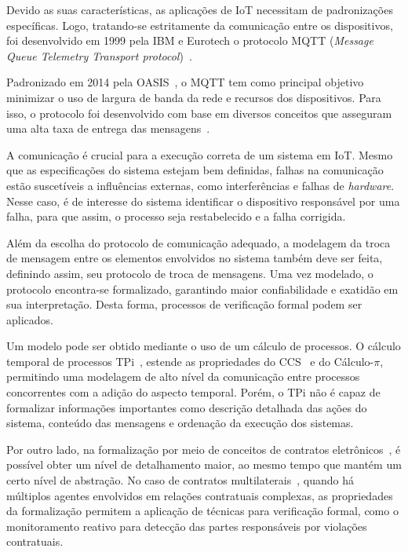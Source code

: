 Devido as suas características, as aplicações de IoT necessitam de padronizações específicas. Logo, tratando-se estritamente da comunicação entre os dispositivos, foi desenvolvido em 1999 pela IBM e Eurotech o protocolo MQTT (\textit{Message Queue Telemetry Transport protocol})~\cite{mqttv3.1}. 

Padronizado em 2014 pela OASIS~\cite{mqttv3.1.1}, o MQTT tem como principal objetivo minimizar o uso de largura de banda da rede e recursos dos dispositivos. Para isso, o protocolo foi desenvolvido com base em diversos conceitos que asseguram uma alta taxa de entrega das mensagens~\cite{chen2014responsive}.

A comunicação é crucial para a execução correta de um sistema em IoT. Mesmo que as especificações do sistema estejam bem definidas, falhas na comunicação estão suscetíveis a influências externas, como interferências e falhas de \textit{hardware}. Nesse caso, é de interesse do sistema identificar o dispositivo responsável por uma falha, para que assim, o processo seja restabelecido e a falha corrigida.

Além da escolha do protocolo de comunicação adequado, a modelagem da troca de mensagem entre os elementos envolvidos no sistema também deve ser feita, definindo assim, seu protocolo de troca de mensagens. Uma vez modelado, o protocolo encontra-se formalizado, garantindo maior confiabilidade e exatidão em sua interpretação. Desta forma, processos de verificação formal podem ser aplicados. 

Um modelo pode ser obtido mediante o uso de um cálculo de processos. O cálculo temporal de processos TPi~\cite{berger2003two}, estende as propriedades do CCS~\cite{milner1986ccs} e do Cálculo-$\pi$, permitindo uma modelagem de alto nível da comunicação entre processos concorrentes com a adição do aspecto temporal. Porém, o TPi não é capaz de formalizar informações importantes como descrição detalhada das ações do sistema, conteúdo das mensagens e ordenação da execução dos sistemas.

Por outro lado, na formalização por meio de conceitos de contratos eletrônicos~\cite{fenech2008conflict}, é possível obter um nível de detalhamento maior, ao mesmo tempo que mantém um certo nível de abstração. No caso de contratos multilaterais~\cite{xu2004multi}, quando há múltiplos agentes envolvidos em relações contratuais complexas, as propriedades da formalização permitem a aplicação de técnicas para verificação formal, como o monitoramento reativo para detecção das partes responsáveis por violações contratuais.

